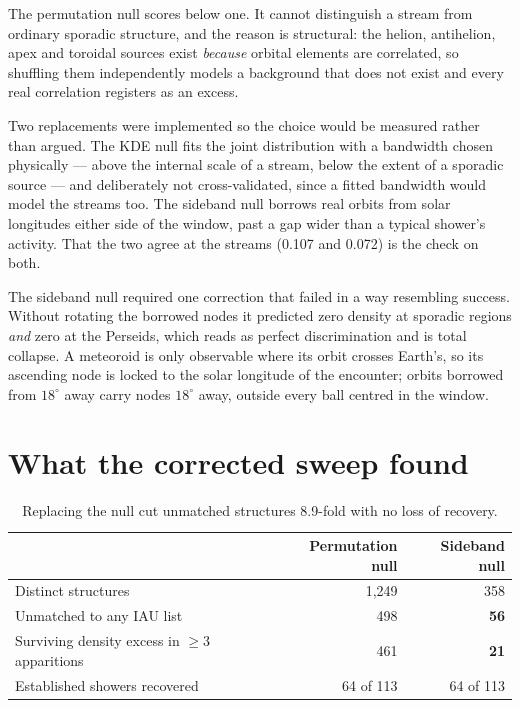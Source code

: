 \documentclass[11pt,a4paper]{report}
\begin{document}
The permutation null scores below one. It cannot distinguish a stream from ordinary sporadic
structure, and the reason is structural: the helion, antihelion, apex and toroidal sources
exist \emph{because} orbital elements are correlated, so shuffling them independently models a
background that does not exist and every real correlation registers as an excess.

Two replacements were implemented so the choice would be measured rather than argued. The KDE
null fits the joint distribution with a bandwidth chosen physically --- above the internal
scale of a stream, below the extent of a sporadic source --- and deliberately not
cross-validated, since a fitted bandwidth would model the streams too. The sideband null
borrows real orbits from solar longitudes either side of the window, past a gap wider than a
typical shower's activity. That the two agree at the streams (0.107 and 0.072) is the check on
both.

The sideband null required one correction that failed in a way resembling success. Without
rotating the borrowed nodes it predicted zero density at sporadic regions \emph{and} zero at
the Perseids, which reads as perfect discrimination and is total collapse. A meteoroid is only
observable where its orbit crosses Earth's, so its ascending node is locked to the solar
longitude of the encounter; orbits borrowed from $18^\circ$ away carry nodes $18^\circ$ away,
outside every ball centred in the window.

\section{What the corrected sweep found}

\begin{table}[h]
\centering
\small
\begin{tabular}{lrr}
\toprule
& Permutation null & Sideband null \\
\midrule
Distinct structures & 1{,}249 & 358 \\
Unmatched to any IAU list & 498 & \textbf{56} \\
Surviving density excess in $\ge 3$ apparitions & 461 & \textbf{21} \\
Established showers recovered & 64 of 113 & 64 of 113 \\
\bottomrule
\end{tabular}
\caption{Replacing the null cut unmatched structures 8.9-fold with no loss of recovery.}
\end{table}
\end{document}

